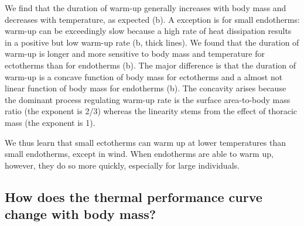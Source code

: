 We find that the duration of warm-up generally increases with body mass and decreases with temperature, as expected (b).
A exception is for small endotherms: warm-up can be exceedingly slow because a high rate of heat dissipation results in a positive but low warm-up rate (b, thick lines).  %
We found that the duration of warm-up is longer and more sensitive to body mass and temperature for ectotherms than for endotherms (b). %
The major difference is that the duration of warm-up is a concave function of body mass for ectotherms and a almost not linear function of body mass for endotherms (b). %
The concavity arises because the dominant process regulating warm-up rate is the surface area-to-body mass ratio (the exponent is 2/3) whereas the linearity stems from the effect of thoracic mass (the exponent is 1).


We thus learn that small ectotherms can warm up at lower temperatures than small endotherms, except in wind.
When endotherms are able to warm up, however, they do so more quickly, especially for large individuals.


\subsection*{How does the thermal performance curve change with body mass?}

